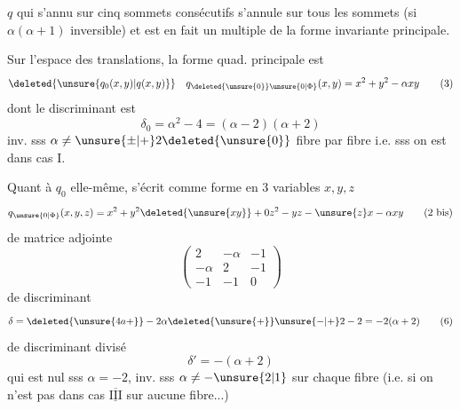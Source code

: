  $q$ qui s'annu sur cinq sommets consécutifs s'annule sur tous les sommets (si $\alpha(\alpha+1)$ inversible) et est en fait un multiple de la forme  invariante principale.

Sur l'espace des translations, la forme quad. principale est
\[
\deleted{\unsure{q_0(x,y)|q(x,y)}}\quad q_{\deleted{\unsure{0}}\unsure{0|\Phi}}(x,y)=x^2+y^2-\alpha xy
\tag*{(3)}
\]
 dont le discriminant est
\[
\delta_0=\alpha^2-4=(\alpha-2)(\alpha+2)\tag*{(4)}
\]
inv. sss $\alpha\ne\unsure{\pm|+}2\deleted{\unsure{0}}$ fibre par fibre i.e. sss on est dans cas I.

Quant à $q_0$ elle-même, s'écrit comme forme en $3$ variables $x,y,z$
\[
q_{\unsure{0|\Phi}}(x,y,z)=x^2+y^2\deleted{\unsure{xy}}+0z^2-yz-\unsure{z}x-\alpha xy
\tag*{(2 bis)}
\]
de matrice adjointe
\[
\begin{pmatrix}2&-\alpha&-1\\-\alpha&2&-1\\-1&-1&0\end{pmatrix}
\tag*{(5)}
\]
de discriminant
\[
\delta=\deleted{\unsure{4a+}}-2\alpha\deleted{\unsure{+}}\unsure{-|+}2-2=-2(\alpha+2)
\tag*{(6)}
\]
de discriminant divisé
\[
\delta'=-(\alpha+2)\tag*{(6$'$)}
\]
qui est nul sss $\alpha=-2$, inv. sss $\alpha\ne-\unsure{2|1}$ sur chaque fibre (i.e. si on n'est pas dans cas $\overline{\underline{\mathrm{III}}}$ sur aucune fibre...)
